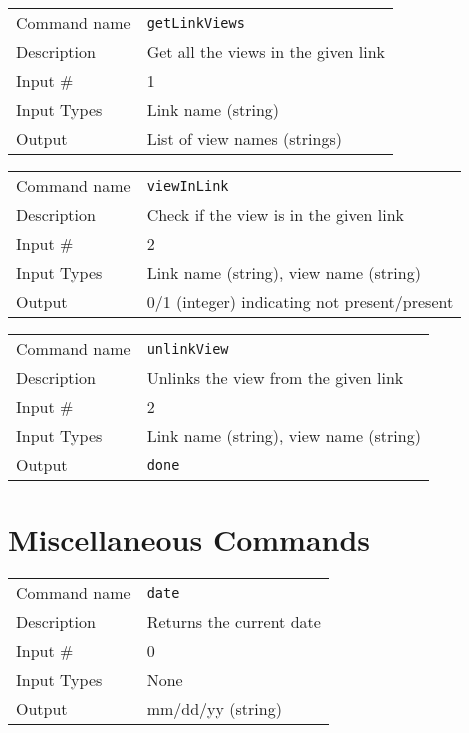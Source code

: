 \bigskip

\noindent
\begin{tabular}{l|p{5in}}
\hline
Command name & {\tt getLinkViews} \\
Description  & Get all the views in the given link \\
Input \#     & 1 \\
Input Types  & Link name (string) \\
Output       & List of view names (strings) \\
\hline
\end{tabular}

\bigskip

\noindent
\begin{tabular}{l|p{5in}}
\hline
Command name & {\tt viewInLink} \\
Description  & Check if the view is in the given link \\
Input \#     & 2 \\
Input Types  & Link name (string), view name (string) \\
Output       & 0/1 (integer) indicating not present/present \\
\hline
\end{tabular}

\bigskip

\noindent
\begin{tabular}{l|p{5in}}
\hline
Command name & {\tt unlinkView} \\
Description  & Unlinks the view from the given link \\
Input \#     & 2 \\
Input Types  & Link name (string), view name (string) \\
Output       & {\tt done} \\
\hline
\end{tabular}

\section{Miscellaneous Commands}

\noindent
\begin{tabular}{l|p{5in}}
\hline
Command name & {\tt date} \\
Description  & Returns the current date \\
Input \#     & 0 \\
Input Types  & None \\
Output       & mm/dd/yy (string) \\
\hline
\end{tabular}

